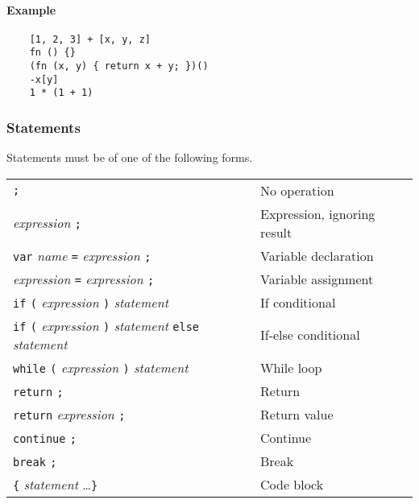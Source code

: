 \paragraph{Example}

\begin{verbatim}
    [1, 2, 3] + [x, y, z]
    fn () {}
    (fn (x, y) { return x + y; })()
    -x[y]
    1 * (1 + 1)
\end{verbatim}

\subsubsection{Statements}

Statements must be of one of the following forms.

\begin{table}[H]
    \begin{tabular}{ l l }
        \verb|;|                                                                                          & No operation                \\
        \textit{expression} \verb|;|                                                                      & Expression, ignoring result \\
        \verb|var| \textit{name} \verb|=| \textit{expression} \verb|;|                                    & Variable declaration        \\
        \textit{expression} \verb|=| \textit{expression} \verb|;|                                         & Variable assignment         \\
        \verb|if| \verb|(| \textit{expression} \verb|)| \textit{statement}                                & If conditional              \\
        \verb|if| \verb|(| \textit{expression} \verb|)| \textit{statement} \verb|else| \textit{statement} & If-else conditional         \\
        \verb|while| \verb|(| \textit{expression} \verb|)| \textit{statement}                             & While loop                  \\
        \verb|return| \verb|;|                                                                            & Return                      \\
        \verb|return| \textit{expression} \verb|;|                                                        & Return value                \\
        \verb|continue| \verb|;|                                                                          & Continue                    \\
        \verb|break| \verb|;|                                                                             & Break                       \\
        \verb|{| \textit{statement} \ldots \verb|}|                                                       & Code block                  \\
    \end{tabular}
\end{table}

